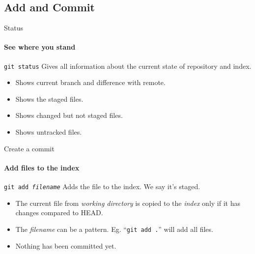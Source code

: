 \documentclass{beamer}
\begin{document}
\subsection{Add and Commit}

\begin{frame}{Status}
\framesubtitle{See where you stand}

\begin{block}{	\texttt{git status}}
	Gives all information about the current state of repository and index.
\end{block}

\begin{itemize}
	\item Shows current branch and difference with remote.
	\item Shows the staged files.
	\item Shows changed but not staged files.
	\item Shows untracked files.
\end{itemize}

\end{frame}

\begin{frame}{Create a commit}
\framesubtitle{Add files to the index}

\begin{block}{	\texttt{git add \emph{filename}}}
	Adds the file to the index. We say it's \alert{staged}.
\end{block}

\begin{itemize}
	\item The current file from \emph{working directory} is copied to the \emph{index} only if it has changes compared to HEAD.
	\item The \emph{filename} can be a pattern. Eg. ``\texttt{git add .}'' will add all files.
	\item Nothing has been committed yet.
\end{itemize}

\end{frame}
\end{document}
